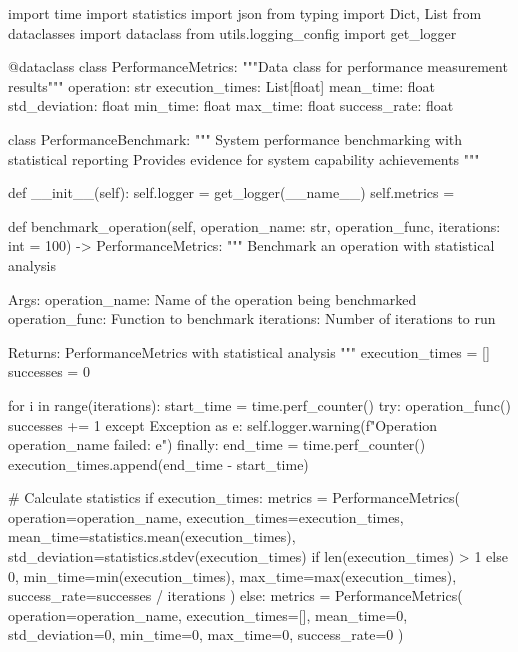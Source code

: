 \documentclass[12pt,a4paper]{report}
\begin{document}
import time
import statistics
import json
from typing import Dict, List
from dataclasses import dataclass
from utils.logging\_config import get\_logger


@dataclass
class PerformanceMetrics:
    """Data class for performance measurement results"""
    operation: str
    execution\_times: List[float]
    mean\_time: float
    std\_deviation: float
    min\_time: float
    max\_time: float
    success\_rate: float


class PerformanceBenchmark:
    """
    System performance benchmarking with statistical reporting
    Provides evidence for system capability achievements
    """

    def \_\_init\_\_(self):
        self.logger = get\_logger(\_\_name\_\_)
        self.metrics = {}

    def benchmark\_operation(self, operation\_name: str, operation\_func,
                            iterations: int = 100) -> PerformanceMetrics:
        """
        Benchmark an operation with statistical analysis
        
        Args:
            operation\_name: Name of the operation being benchmarked
            operation\_func: Function to benchmark
            iterations: Number of iterations to run
            
        Returns:
            PerformanceMetrics with statistical analysis
        """
        execution\_times = []
        successes = 0

        for i in range(iterations):
            start\_time = time.perf\_counter()
            try:
                operation\_func()
                successes += 1
            except Exception as e:
                self.logger.warning(f"Operation {operation\_name} failed: {e}")
            finally:
                end\_time = time.perf\_counter()
                execution\_times.append(end\_time - start\_time)

        \# Calculate statistics
        if execution\_times:
            metrics = PerformanceMetrics(
                operation=operation\_name,
                execution\_times=execution\_times,
                mean\_time=statistics.mean(execution\_times),
                std\_deviation=statistics.stdev(execution\_times) if len(execution\_times) > 1 else 0,
                min\_time=min(execution\_times),
                max\_time=max(execution\_times),
                success\_rate=successes / iterations
            )
        else:
            metrics = PerformanceMetrics(
                operation=operation\_name,
                execution\_times=[],
                mean\_time=0,
                std\_deviation=0,
                min\_time=0,
                max\_time=0,
                success\_rate=0
            )
\end{document}
